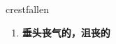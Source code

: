
\begin{frame}
{\huge crestfallen}
\begin{center}
\begin{enumerate}\Large
  \item \textbf{垂头丧气的，沮丧的}
\end{enumerate}
\end{center}
\end{frame}
